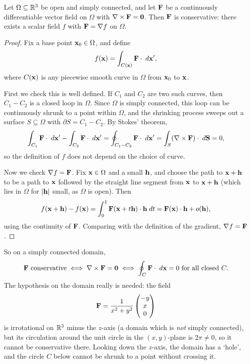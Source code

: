 \documentclass[a4paper]{scrartcl}
\begin{document}
\begin{theorem}
	Let $\Omega \subseteq \mathbb{R}^3$ be open and simply connected, and let $\mathbf{F}$ be a continuously differentiable vector field on $\Omega$ with $\nabla \times \mathbf{F} = \mathbf{0}$. Then $\mathbf{F}$ is conservative: there exists a scalar field $f$ with $\mathbf{F} = \nabla f$ on $\Omega$.
\end{theorem}
\begin{proof}
	Fix a base point $\mathbf{x}_0 \in \Omega$, and define
	$$
	f(\mathbf{x}) = \int_{C(\mathbf{x})} \mathbf{F} \cdot \; d \mathbf{x}',
	$$
	where $C(\mathbf{x})$ is any piecewise smooth curve in $\Omega$ from $\mathbf{x}_0$ to $\mathbf{x}$.

	First we check this is well defined. If $C_1$ and $C_2$ are two such curves, then $C_1 - C_2$ is a closed loop in $\Omega$. Since $\Omega$ is simply connected, this loop can be continuously shrunk to a point within $\Omega$, and the shrinking process sweeps out a surface $S \subseteq \Omega$ with $\partial S = C_1 - C_2$. By Stokes' theorem,
	$$
	\int_{C_1} \mathbf{F} \cdot \; d \mathbf{x}' - \int_{C_2} \mathbf{F} \cdot \; d \mathbf{x}' = \oint_{C_1 - C_2} \mathbf{F} \cdot \; d \mathbf{x}' = \int_S (\nabla \times \mathbf{F}) \cdot \; d \mathbf{S} = 0,
	$$
	so the definition of $f$ does not depend on the choice of curve.

	Now we check $\nabla f = \mathbf{F}$. Fix $\mathbf{x} \in \Omega$ and a small $\mathbf{h}$, and choose the path to $\mathbf{x} + \mathbf{h}$ to be a path to $\mathbf{x}$ followed by the straight line segment from $\mathbf{x}$ to $\mathbf{x} + \mathbf{h}$ (which lies in $\Omega$ for $|\mathbf{h}|$ small, as $\Omega$ is open). Then
	$$
	f(\mathbf{x} + \mathbf{h}) - f(\mathbf{x}) = \int_0^1 \mathbf{F}(\mathbf{x} + t \mathbf{h}) \cdot \mathbf{h} \; d t = \mathbf{F}(\mathbf{x}) \cdot \mathbf{h} + o(\mathbf{h}),
	$$
	using the continuity of $\mathbf{F}$. Comparing with the definition of the gradient, $\nabla f = \mathbf{F}$.
\end{proof}

So on a simply connected domain,
$$
\mathbf{F} \text{ conservative} \iff \nabla \times \mathbf{F} = \mathbf{0} \iff \oint_C \mathbf{F} \cdot \; d \mathbf{x} = 0 \text{ for all closed } C.
$$
The hypothesis on the domain really is needed: the field
$$
\mathbf{F} = \frac{1}{x^2 + y^2}\begin{pmatrix}
	-y \\ x \\ 0
\end{pmatrix}
$$
is irrotational on $\mathbb{R}^3$ minus the $z$-axis (a domain which is \emph{not} simply connected), but its circulation around the unit circle in the $(x, y)$-plane is $2 \pi \neq 0$, so it cannot be conservative there. Looking down the $z$-axis, the domain has a `hole', and the circle $C$ below cannot be shrunk to a point without crossing it.
\end{document}
